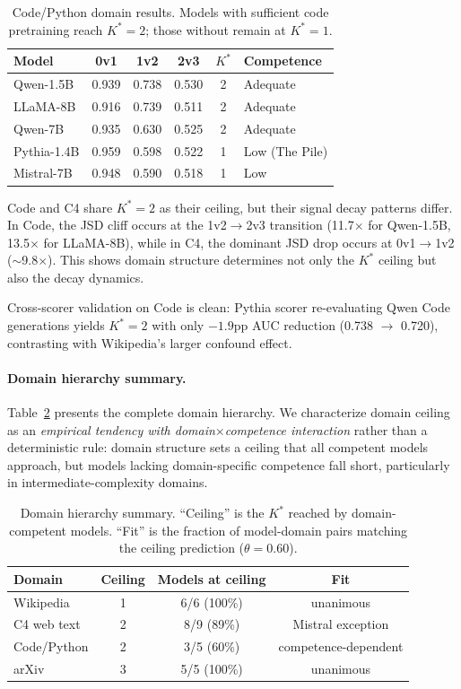 \documentclass[11pt,a4paper]{article}
\begin{document}
\begin{table}[t]
\centering
\small
\caption{Code/Python domain results. Models with sufficient code pretraining reach $K^*\!=\!2$; those without remain at $K^*\!=\!1$.}
\label{tab:code}
\begin{tabular}{lccccl}
\toprule
Model & 0v1 & 1v2 & 2v3 & $K^*$ & Competence \\
\midrule
Qwen-1.5B   & 0.939 & 0.738 & 0.530 & 2 & Adequate \\
LLaMA-8B    & 0.916 & 0.739 & 0.511 & 2 & Adequate \\
Qwen-7B     & 0.935 & 0.630 & 0.525 & 2 & Adequate \\
\midrule
Pythia-1.4B  & 0.959 & 0.598 & 0.522 & 1 & Low (The Pile) \\
Mistral-7B   & 0.948 & 0.590 & 0.518 & 1 & Low \\
\bottomrule
\end{tabular}
\end{table}

Code and C4 share $K^*\!=\!2$ as their ceiling, but their signal decay patterns differ. In Code, the JSD cliff occurs at the 1v2$\to$2v3 transition (11.7$\times$ for Qwen-1.5B, 13.5$\times$ for LLaMA-8B), while in C4, the dominant JSD drop occurs at 0v1$\to$1v2 ($\sim$9.8$\times$). This shows domain structure determines not only the $K^*$ ceiling but also the decay dynamics.

Cross-scorer validation on Code is clean: Pythia scorer re-evaluating Qwen Code generations yields $K^*\!=\!2$ with only $-1.9$pp AUC reduction (0.738 $\to$ 0.720), contrasting with Wikipedia's larger confound effect.

\paragraph{Domain hierarchy summary.}
Table~\ref{tab:domain_summary} presents the complete domain hierarchy. We characterize domain ceiling as an \emph{empirical tendency with domain$\times$competence interaction} rather than a deterministic rule: domain structure sets a ceiling that all competent models approach, but models lacking domain-specific competence fall short, particularly in intermediate-complexity domains.

\begin{table}[t]
\centering
\small
\caption{Domain hierarchy summary. ``Ceiling'' is the $K^*$ reached by domain-competent models. ``Fit'' is the fraction of model-domain pairs matching the ceiling prediction ($\theta=0.60$).}
\label{tab:domain_summary}
\begin{tabular}{lccc}
\toprule
Domain & Ceiling & Models at ceiling & Fit \\
\midrule
Wikipedia & 1 & 6/6 (100\%) & unanimous \\
C4 web text & 2 & 8/9 (89\%) & Mistral exception \\
Code/Python & 2 & 3/5 (60\%) & competence-dependent \\
arXiv & 3 & 5/5 (100\%) & unanimous \\
\bottomrule
\end{tabular}
\end{table}
\end{document}
